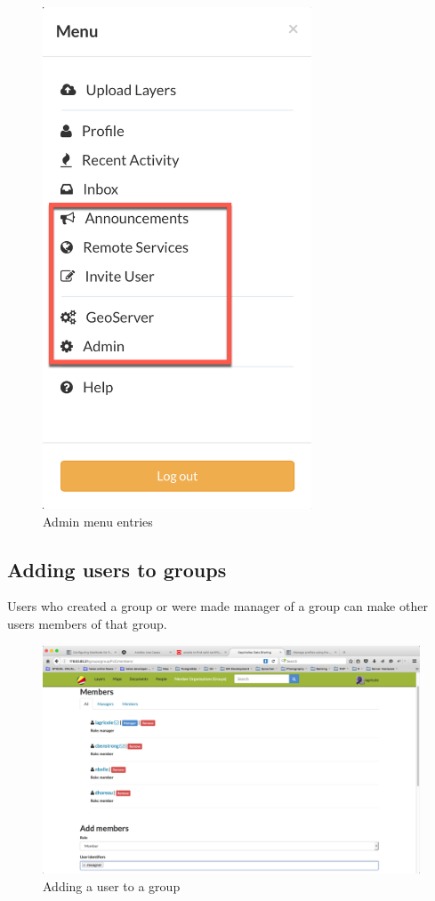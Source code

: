 \documentclass[a4paper,12pt,titlepage]{article}
\begin{document}
\begin{figure}[H]
	\centering
	\includegraphics[width=8cm]{Images/admin_menu1.png}
	\caption{Admin menu entries}\label{fig:admin_menu1}
\end{figure}

\subsection{Adding users to groups}

Users who created a group or were made manager of a group can make other users members of that group.

\begin{figure}[H]
	\centering
	\includegraphics[width=12cm]{Images/add_user_to_group.png}
	\caption{Adding a user to a group}\label{fig:add_user_to_group}
\end{figure}
\end{document}
